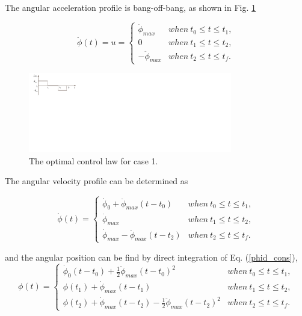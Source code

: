 \documentclass[letterpaper, paper,12pt]{AAS}		%
\begin{document}
	The angular acceleration profile is bang-off-bang, as shown in Fig. \ref{bang_off_bang}

	\begin{equation}\label{phidd_cons}
	\ddot{\phi}(t)=u=\left\{
	\begin{array}{ll}
	\ddot{\phi}_{max}& when\  t_0\leq t\leq t_1,\\
	0& when\  t_1\leq t \leq t_2,\\
	-\ddot{\phi}_{max}& when \ t_2\leq t\leq t_f.
	\end{array}
	\right.
	\end{equation}

	\begin{figure}[H]
	\begin{center}
	\includegraphics[width=3.5in]{./Figures/bang_off_bang}
	\caption{The optimal control law for case 1.}
	\label{bang_off_bang}
	\end{center}
	\end{figure}
 The angular velocity profile can be determined as

	\begin{equation}\label{phid_cons}
	\dot{\phi}(t)=\left\{
	\begin{array}{ll}
	\dot{\phi}_0+\ddot{\phi}_{max}(t-t_0)& when\  t_0\leq t\leq t_1,\\
	\dot{\phi}_{max}& when\  t_1\leq t \leq t_2,\\
	\dot{\phi}_{max}-\ddot{\phi}_{max}(t-t_2)& when \ t_2\leq t\leq t_f.
	\end{array}
	\right.
	\end{equation}

and the angular position can be find by direct integration of Eq. (\ref{phid_cons}),
	\begin{equation}\label{phi_cons}
	\phi(t)=\left\{
	\begin{array}{ll}
	\dot{\phi}_0(t-t_0)+\frac{1}{2}\ddot{\phi}_{max}(t-t_0)^2& when\  t_0\leq t\leq t_1,\\
	\phi(t_1)+ \dot{\phi}_{max}(t-t_1)& when\  t_1\leq t \leq t_2,\\
	\phi(t_2)+\dot{\phi}_{max}(t-t_2)-\frac{1}{2}\ddot{\phi}_{max}(t-t_2)^2& when \ t_2\leq t\leq t_f.
	\end{array}
	\right.
	\end{equation}
	
\end{document}
